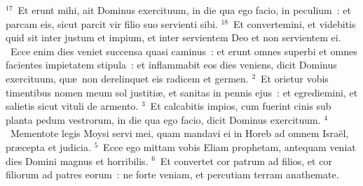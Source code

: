 ${}^{17}$~Et erunt mihi, ait Dominus exercituum, in die qua ego facio, in peculium~: et parcam eis, sicut parcit vir filio suo servienti sibi.
${}^{18}$~Et convertemini, et videbitis quid sit inter justum et impium, et inter servientem Deo et non servientem ei.
~\lettrine[lines=10,image=true,loversize=0.05,lraise=-0.03]{E}{}cce enim dies veniet succensa quasi caminus~: et erunt omnes superbi et omnes facientes impietatem stipula~: et inflammabit eos dies veniens, dicit Dominus exercituum, qu\ae\ non derelinquet eis radicem et germen.
${}^{2}$~Et orietur vobis timentibus nomen meum sol justiti\ae , et sanitas in pennis ejus~: et egrediemini, et salietis sicut vituli de armento.
${}^{3}$~Et calcabitis impios, cum fuerint cinis sub planta pedum vestrorum, in die qua ego facio, dicit Dominus exercituum.
${}^{4}$~Mementote legis Moysi servi mei, quam mandavi ei in Horeb ad omnem Isra\"el, pr\ae cepta et judicia.
${}^{5}$~Ecce ego mittam vobis Eliam prophetam, antequam veniat dies Domini magnus et horribilis.
${}^{6}$~Et convertet cor patrum ad filios, et cor filiorum ad patres eorum~: ne forte veniam, et percutiam terram anathemate.
